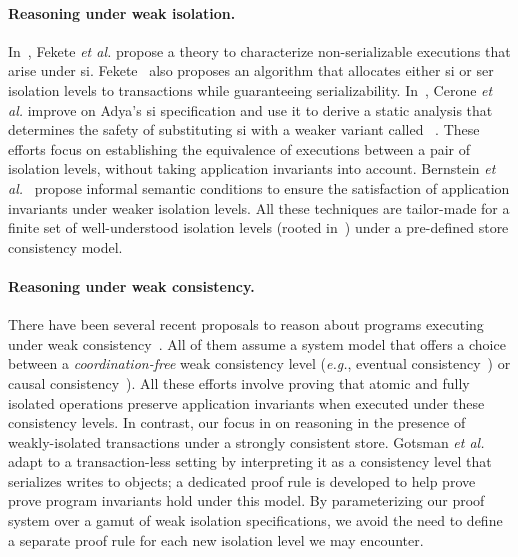 \paragraph{Reasoning under weak isolation.} In~\cite{feketessi}, Fekete
\emph{et al.} propose a theory to characterize non-serializable
executions that arise under {\sc si}. Fekete~\cite{fekete2005} also
proposes an algorithm that allocates either {\sc si} or {\sc ser}
isolation levels to transactions while guaranteeing
serializability. In~\cite{gotsmanpodc16}, Cerone \emph{et al.} improve
on Adya's {\sc si} specification and use it to derive a static
analysis that determines the safety of substituting {\sc si} with a
weaker variant called ~\cite{psi}.
These efforts focus on establishing the equivalence of executions
between a pair of isolation levels, without taking application
invariants into account.  Bernstein \emph{et al.}~\cite{bern2000}
propose informal semantic conditions to ensure the satisfaction of
application invariants under weaker isolation levels.  All these
techniques are tailor-made for a finite set of well-understood
isolation levels (rooted in~\cite{berenson}) under a pre-defined store
consistency model.

\vspace*{-4pt}
\paragraph{Reasoning under weak consistency.} There have been several
recent proposals to reason about programs executing under weak
consistency~\cite{bailisvldb, alvarocalm, gotsmanpopl16,redblueatc,
redblueosdi, ecinec}. All of them assume a system model that offers a
choice between a \emph{coordination-free} weak consistency level
(\emph{e.g.}, eventual consistency~\cite{redblueosdi, redblueatc,
ecinec, alvarocalm, bailisvldb}) or causal
consistency~\cite{lbc16,gotsmanpopl16}). All these efforts involve
proving that atomic and fully isolated operations preserve application
invariants when executed under these consistency levels.  In contrast,
our focus in on reasoning in the presence of weakly-isolated
transactions under a strongly consistent store.  Gotsman \emph{et
al.}~\cite{gotsmanpopl16} adapt  to a
transaction-less setting by interpreting it as a consistency level
that serializes writes to objects; a dedicated proof rule is developed
to help prove prove program invariants hold under this model. By
parameterizing our proof system over a gamut of weak isolation
specifications, we avoid the need to define a separate proof rule for
each new isolation level we may encounter.

